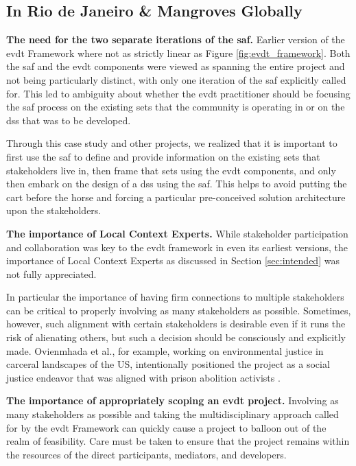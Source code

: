 \subsection{In Rio de Janeiro \& Mangroves Globally}

\textbf{The need for the two separate iterations of the \ac{saf}.} Earlier version of the \ac{evdt} Framework where not as strictly linear as Figure \ref{fig:evdt_framework}. Both the \ac{saf} and the \ac{evdt} components were viewed as spanning the entire project and not being particularly distinct, with only one iteration of the \ac{saf} explicitly called for. This led to ambiguity about whether the \ac{evdt} practitioner should be focusing the \ac{saf} process on the existing {sets} that the community is operating in or on the \ac{dss} that was to be developed. 

Through this case study and other projects, we realized that it is important to first use the \ac{saf} to define and provide information on the existing \ac{sets} that stakeholders live in, then frame that \ac{sets} using the \ac{evdt} components, and only then embark on the design of a \ac{dss} using the \ac{saf}. This helps to avoid putting the cart before the horse and forcing a particular pre-conceived solution architecture upon the stakeholders. 

\textbf{The importance of Local Context Experts.} While stakeholder participation and collaboration was key to the \ac{evdt} framework in even its earliest versions, the importance of Local Context Experts as discussed in Section \ref{sec:intended} was not fully appreciated. 

In particular the importance of having firm connections to multiple stakeholders can be critical to properly involving as many stakeholders as possible. Sometimes, however, such alignment with certain stakeholders is desirable even if it runs the risk of alienating others, but such a decision should be consciously and explicitly made. Ovienmhada et al., for example, working on environmental justice in carceral landscapes of the US, intentionally positioned the project as a social justice endeavor that was aligned with prison abolition activists \cite{ovienmhadaEnvironmentVulnerabilityDecisionTechnologyModelingFramework2021}. 

\textbf{The importance of appropriately scoping an \ac{evdt} project.} Involving as many stakeholders as possible and taking the multidisciplinary approach called for by the \ac{evdt} Framework can quickly cause a project to balloon out of the realm of feasibility. Care must be taken to ensure that the project remains within the resources of the direct participants, mediators, and developers.

